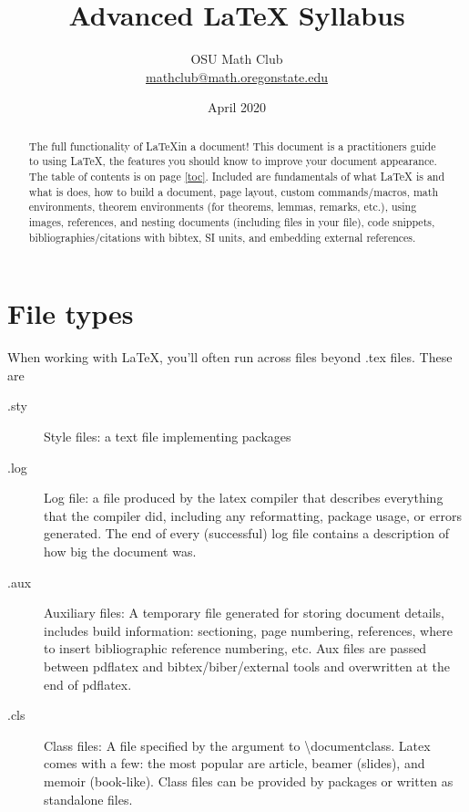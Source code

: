 \documentclass[11pt]{article}
\title{Advanced \LaTeX{} Syllabus}
\author{OSU Math Club\\
\href{mailto:mathclub@math.oregonstate.edu}{mathclub@math.oregonstate.edu}}
\date{April 2020}
\begin{document}
\maketitle

\begin{abstract}
The full functionality of \LaTeX in a document! This document is a practitioners guide to using \LaTeX{}, the features you should know to improve your document appearance. The table of contents is on page \ref{toc}. Included are fundamentals of what \LaTeX{} is and what is does, how to build a document, page layout, custom commands/macros, math environments, theorem environments (for theorems, lemmas, remarks, etc.), using images, references, and nesting documents (including files in your file), code snippets, bibliographies/citations with bibtex, SI units, and embedding external references. 
\end{abstract}
\section{File types}
When working with \LaTeX, you'll often run across files beyond .tex files. These are
\begin{description}
	\item[.sty] Style files: a text file implementing packages
	\item[.log] Log file: a file produced by the latex compiler that describes everything that the compiler did, including any reformatting, package usage, or errors generated. The end of every (successful) log file contains a description of how big the document was. 
	\item[.aux] Auxiliary files: A temporary file generated for storing document details, includes build information: sectioning, page numbering, references, where to insert bibliographic reference numbering, etc. Aux files are passed between pdflatex and bibtex/biber/external tools and overwritten at the end of pdflatex. 
	\item [.cls] Class files: A file specified by the argument to \textbackslash documentclass. Latex comes with a few: the most popular are article, beamer (slides), and memoir (book-like). Class files can be provided by packages or written as standalone files.
\end{description}
\end{document}
